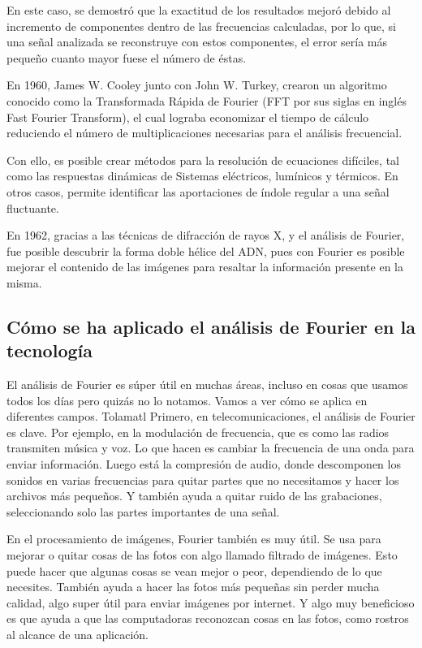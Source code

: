 En este caso, se demostró que la exactitud de los resultados mejoró debido al incremento de componentes dentro de las frecuencias calculadas, por lo que, si una señal analizada se reconstruye con estos componentes, el error sería más pequeño cuanto mayor fuese el número de éstas.

En 1960, James W. Cooley junto con John W. Turkey, crearon un algoritmo conocido como la Transformada Rápida de Fourier (FFT por sus siglas en inglés Fast Fourier Transform), el cual lograba economizar el tiempo de cálculo reduciendo el número de multiplicaciones necesarias para el análisis frecuencial.

Con ello, es posible crear métodos para la resolución de ecuaciones difíciles, tal como las respuestas dinámicas de Sistemas eléctricos, lumínicos y térmicos. En otros casos, permite identificar las aportaciones de índole regular a una señal fluctuante.

En 1962, gracias a las técnicas de difracción de rayos X, y el análisis de Fourier, fue posible descubrir la forma doble hélice del ADN, pues con Fourier es posible mejorar el contenido de las imágenes para resaltar la información presente en la misma.

\subsection{Cómo se ha aplicado el análisis de Fourier en la tecnología}

El análisis de Fourier es súper útil en muchas áreas, incluso en cosas que usamos todos los días pero quizás no lo notamos. Vamos a ver cómo se aplica en diferentes campos.
Tolamatl
Primero, en telecomunicaciones, el análisis de Fourier es clave. Por ejemplo, en la modulación de frecuencia, que es como las radios transmiten música y voz. Lo que hacen es cambiar la frecuencia de una onda para enviar información. Luego está la compresión de audio, donde descomponen los sonidos en varias frecuencias para quitar partes que no necesitamos y hacer los archivos más pequeños. Y también ayuda a quitar ruido de las grabaciones, seleccionando solo las partes importantes de una señal.

En el procesamiento de imágenes, Fourier también es muy útil. Se usa para mejorar o quitar cosas de las fotos con algo llamado filtrado de imágenes. Esto puede hacer que algunas cosas se vean mejor o peor, dependiendo de lo que necesites. También ayuda a hacer las fotos más pequeñas sin perder mucha calidad, algo super útil para enviar imágenes por internet. Y algo muy beneficioso es que ayuda a que las computadoras reconozcan cosas en las fotos, como rostros al alcance de una aplicación.

